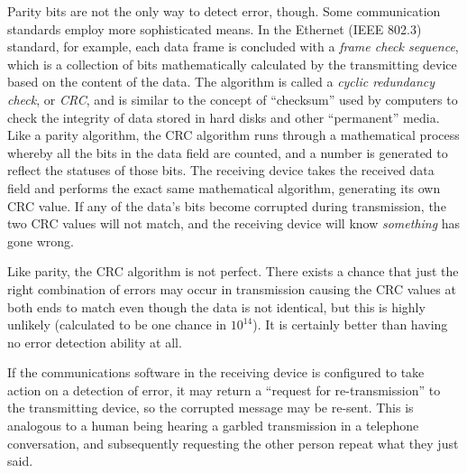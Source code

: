 Parity bits are not the only way to detect error, though.  Some communication standards employ more sophisticated means.  In the Ethernet (IEEE 802.3) standard, for example, each data frame is concluded with a \textit{frame check sequence}, which is a collection of bits mathematically calculated by the transmitting device based on the content of the data.  The algorithm is called a \textit{cyclic redundancy check}, or \textit{CRC}, and is similar to the concept of ``checksum'' used by computers to check the integrity of data stored in hard disks and other ``permanent'' media.  Like a parity algorithm, the CRC algorithm runs through a mathematical process whereby all the bits in the data field are counted, and a number is generated to reflect the statuses of those bits.  The receiving device takes the received data field and performs the exact same mathematical algorithm, generating its own CRC value.  If any of the data's bits become corrupted during transmission, the two CRC values will not match, and the receiving device will know \textit{something} has gone wrong.    

Like parity, the CRC algorithm is not perfect.  There exists a chance that just the right combination of errors may occur in transmission causing the CRC values at both ends to match even though the data is not identical, but this is highly unlikely (calculated to be one chance in $10^{14}$).  It is certainly better than having no error detection ability at all.

If the communications software in the receiving device is configured to take action on a detection of error, it may return a ``request for re-transmission'' to the transmitting device, so the corrupted message may be re-sent.  This is analogous to a human being hearing a garbled transmission in a telephone conversation, and subsequently requesting the other person repeat what they just said.

\vskip 10pt

